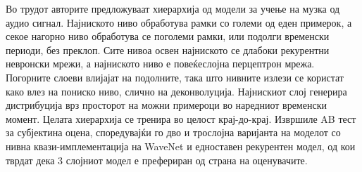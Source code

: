 Во трудот \cite{Mehri2016} авторите предложуваат хиерархија од модели за учење на музка од аудио сигнал. Најниското ниво обработува рамки со големи од еден примерок, а секое нагорно ниво обработува се поголеми рамки, или подолги временски периоди, без преклоп. Сите нивоа освен најниското се длабоки рекурентни невронски мрежи, а најниското ниво е повеќеслојна перцептрон мрежа. Погорните слоеви влијајат на подолните, така што нивните излези се користат како влез на пониско ниво, слично на деконволуција. Најнискиот слој генерира дистрибуција врз просторот на можни примероци во наредниот временски момент. Целата хиерархија се тренира во целост крај-до-крај. Извршиле AB тест за субјектина оцена, споредувајќи го дво и трослојна варијанта на моделот со нивна квази-имплементација на WaveNet \cite{Oord2016} и едноставен рекурентен модел, од кои тврдат дека 3 слојниот модел е префериран од страна на оценувачите.

